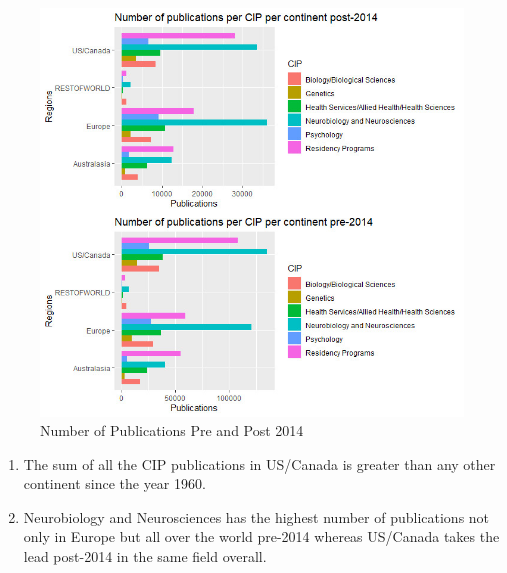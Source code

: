 \documentclass[a4paper,11pt]{article}
\theoremstyle{mytheor}
\begin{document}
\begin{figure}[htp]
    \centering
    \includegraphics[width=15cm]{Q5_plot.jpeg}
    \caption{Number of Publications Pre and Post 2014}
    \label{fig:pre&post2014}
\end{figure}


\begin{enumerate}[1.]
    
\item The sum of all the CIP publications in US/Canada is greater than any other continent since the year 1960. 

\item Neurobiology and Neurosciences has the highest number of publications not only in Europe but all over the world pre-2014 whereas US/Canada takes the lead post-2014 in the same field overall.

\end{enumerate}
\end{document}
